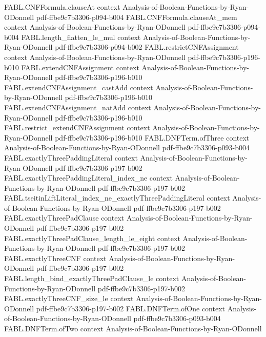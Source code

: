 \begin{theorem}
\proofstep
  {FABL.CNFFormula.clauseAt}
  {context}
  {Analysis-of-Boolean-Functions-by-Ryan-ODonnell}
  {pdf-ffbe9c7b3306-p094-b004}
\proofstep
  {FABL.CNFFormula.clauseAt_mem}
  {context}
  {Analysis-of-Boolean-Functions-by-Ryan-ODonnell}
  {pdf-ffbe9c7b3306-p094-b004}
\proofstep
  {FABL.length_flatten_le_mul}
  {context}
  {Analysis-of-Boolean-Functions-by-Ryan-ODonnell}
  {pdf-ffbe9c7b3306-p094-b002}
\proofstep
  {FABL.restrictCNFAssignment}
  {context}
  {Analysis-of-Boolean-Functions-by-Ryan-ODonnell}
  {pdf-ffbe9c7b3306-p196-b010}
\proofstep
  {FABL.extendCNFAssignment}
  {context}
  {Analysis-of-Boolean-Functions-by-Ryan-ODonnell}
  {pdf-ffbe9c7b3306-p196-b010}
\proofstep
  {FABL.extendCNFAssignment_castAdd}
  {context}
  {Analysis-of-Boolean-Functions-by-Ryan-ODonnell}
  {pdf-ffbe9c7b3306-p196-b010}
\proofstep
  {FABL.extendCNFAssignment_natAdd}
  {context}
  {Analysis-of-Boolean-Functions-by-Ryan-ODonnell}
  {pdf-ffbe9c7b3306-p196-b010}
\proofstep
  {FABL.restrict_extendCNFAssignment}
  {context}
  {Analysis-of-Boolean-Functions-by-Ryan-ODonnell}
  {pdf-ffbe9c7b3306-p196-b010}
\proofstep
  {FABL.DNFTerm.ofThree}
  {context}
  {Analysis-of-Boolean-Functions-by-Ryan-ODonnell}
  {pdf-ffbe9c7b3306-p093-b004}
\proofstep
  {FABL.exactlyThreePaddingLiteral}
  {context}
  {Analysis-of-Boolean-Functions-by-Ryan-ODonnell}
  {pdf-ffbe9c7b3306-p197-b002}
\proofstep
  {FABL.exactlyThreePaddingLiteral_index_ne}
  {context}
  {Analysis-of-Boolean-Functions-by-Ryan-ODonnell}
  {pdf-ffbe9c7b3306-p197-b002}
\proofstep
  {FABL.tseitinLiftLiteral_index_ne_exactlyThreePaddingLiteral}
  {context}
  {Analysis-of-Boolean-Functions-by-Ryan-ODonnell}
  {pdf-ffbe9c7b3306-p197-b002}
\proofstep
  {FABL.exactlyThreePadClause}
  {context}
  {Analysis-of-Boolean-Functions-by-Ryan-ODonnell}
  {pdf-ffbe9c7b3306-p197-b002}
\proofstep
  {FABL.exactlyThreePadClause_length_le_eight}
  {context}
  {Analysis-of-Boolean-Functions-by-Ryan-ODonnell}
  {pdf-ffbe9c7b3306-p197-b002}
\proofstep
  {FABL.exactlyThreeCNF}
  {context}
  {Analysis-of-Boolean-Functions-by-Ryan-ODonnell}
  {pdf-ffbe9c7b3306-p197-b002}
\proofstep
  {FABL.length_bind_exactlyThreePadClause_le}
  {context}
  {Analysis-of-Boolean-Functions-by-Ryan-ODonnell}
  {pdf-ffbe9c7b3306-p197-b002}
\proofstep
  {FABL.exactlyThreeCNF_size_le}
  {context}
  {Analysis-of-Boolean-Functions-by-Ryan-ODonnell}
  {pdf-ffbe9c7b3306-p197-b002}
\proofstep
  {FABL.DNFTerm.ofOne}
  {context}
  {Analysis-of-Boolean-Functions-by-Ryan-ODonnell}
  {pdf-ffbe9c7b3306-p093-b004}
\proofstep
  {FABL.DNFTerm.ofTwo}
  {context}
  {Analysis-of-Boolean-Functions-by-Ryan-ODonnell}

\end{theorem}
